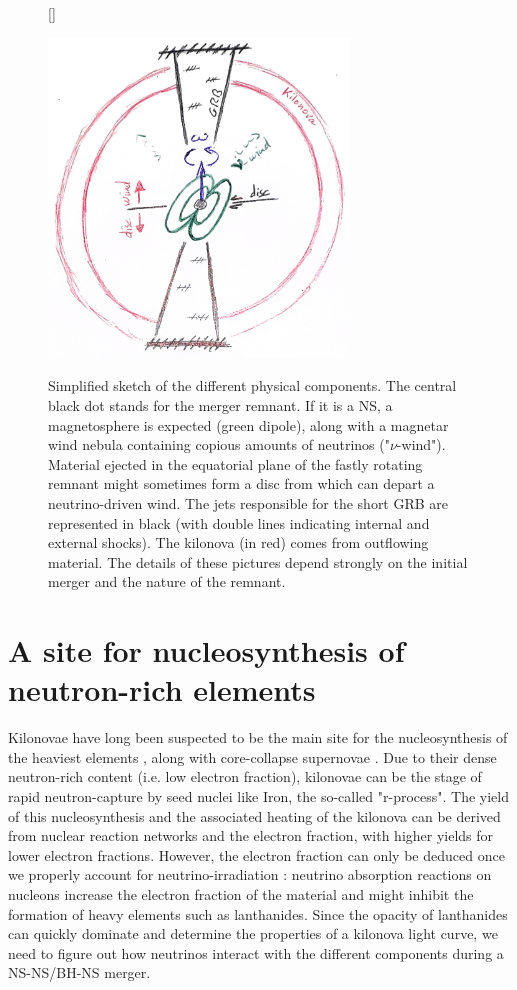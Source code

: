 \documentclass[12pt,onecolumn]{article}
\makeatletter
\newcommand{\grb}{GRB\xspace}
\newcommand*{\ns}{NS\@\xspace}
\newcommand*{\bh}{BH\@\xspace}
\newcommand*{\ie}{i.e.\@\xspace}
\makeatother
\begin{document}
\begin{figure}[!b]
\vspace*{-0.3cm}
[\FBwidth]
{\caption{Simplified sketch of the different physical components. The central black dot stands for the merger remnant. If it is a \ns, a magnetosphere is expected (green dipole), along with a magnetar wind nebula containing copious amounts of neutrinos ("$\nu$-wind"). Material ejected in the equatorial plane of the fastly rotating remnant might sometimes form a disc from which can depart a neutrino-driven wind. The jets responsible for the short \grb are represented in black (with double lines indicating internal and external shocks). The kilonova (in red) comes from outflowing material. The details of these pictures depend strongly on the initial merger and the nature of the remnant.}\label{fig:sketch}}
{\includegraphics[width=8cm]{Figures/sketch_GRB_kilonova.jpg}}
\end{figure}

\section{A site for nucleosynthesis of neutron-rich elements}

Kilonovae have long been suspected to be the main site for the nucleosynthesis of the heaviest elements \citep{Lattimer1974}, along with core-collapse supernovae \citep{MacFadyen1999}. Due to their dense neutron-rich content (\ie low electron fraction), kilonovae can be the stage of rapid neutron-capture by seed nuclei like Iron, the so-called "r-process". The yield of this nucleosynthesis and the associated heating of the kilonova can be derived from nuclear reaction networks \citep{Metzger2010} and the electron fraction, with higher yields for lower electron fractions. However, the electron fraction can only be deduced once we properly account for neutrino-irradiation : neutrino absorption reactions on nucleons increase the electron fraction of the material and might inhibit the formation of heavy elements such as lanthanides. Since the opacity of lanthanides can quickly dominate and determine the properties of a kilonova light curve, we need to figure out how neutrinos interact with the different components during a \ns-\ns/\bh-\ns merger.
\end{document}
